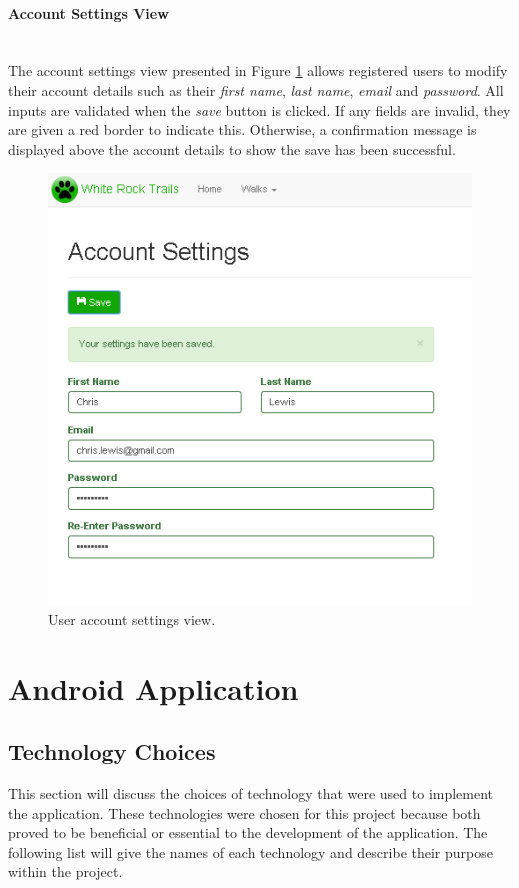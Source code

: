 \documentclass[11pt,a4paper]{report}
\begin{document}
\paragraph{Account Settings View}\mbox{}\\
The account settings view presented in Figure \ref{fig:user-account} allows registered users to modify their account details such as their \emph{first name}, \emph{last name}, \emph{email} and \emph{password}. All inputs are validated when the \emph{save} button is clicked. If any fields are invalid, they are given a red border to indicate this. Otherwise, a confirmation message is displayed above the account details to show the save has been successful.

\begin{figure}[H]
\centering
\includegraphics[width=0.7\linewidth]{./img/webportal/user-account}
\caption{User account settings view.}
\label{fig:user-account}
\end{figure}


\section{Android Application}
\label{sec:android-design}

\subsection{Technology Choices}
This section will discuss the choices of technology that were used to implement the application. These technologies were chosen for this project because both proved to be beneficial or essential to the development of the application. The following list will give the names of each technology and describe their purpose within the project.
\end{document}
